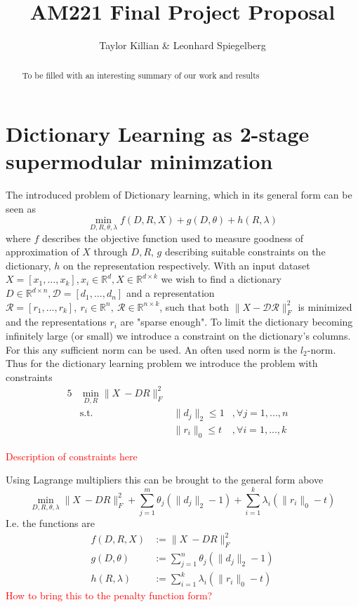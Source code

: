 \documentclass{article}
\newcommand{\R}{\mathbb{R}}
\begin{document}
\title{AM221 Final Project Proposal}
\author{Taylor Killian \& Leonhard Spiegelberg}
\maketitle

\begin{abstract}
To be filled with an interesting summary of our work and results

\end{abstract}


\section{Dictionary Learning as 2-stage supermodular minimzation}
The introduced problem of Dictionary learning, which in its general form can be seen as
\[
\min_{D, R, \theta, \lambda} f(D, R, X) + g(D, \theta) + h(R, \lambda)
\]
where $f$ describes the objective function used to measure goodness of approximation of $X$ through $D, R$, $g$ describing suitable constraints on the dictionary, $h$ on the representation respectively.
With an input dataset $X=[x_1, \dots, x_k],  x_i \in \R^d,  X \in \R^{d\times k}$ we wish to find a dictionary $D \in \R^{d\times n},  \mathcal{D} = [d_1, \dots, d_n]$ and a representation $\mathcal{R}=[r_1,\dots,r_k], \ r_i\in\R^n, \ \mathcal{R}\in\R^{n\times k}$, such that both $\|X-\mathcal{D}\mathcal{R}\|_F^2$ is minimized and the representations $r_i$ are "sparse enough". To limit the dictionary becoming infinitely large (or small) we introduce a constraint on the dictionary's columns. For this any sufficient norm can be used. An often used norm is the $l_2$-norm. 
Thus for the dictionary learning problem we introduce the problem with constraints
\begin{alignat}{5}
         &\min_{D, R} \|X \ -D R\|_F^2  & \quad   \\
         &\text{s.t.}  \quad  &\|d_j\|_2 \leq 1&, \forall j=1, ...,n  \quad \\
         &  \quad  &\|r_i\|_0 \leq t&, \forall i=1, ...,k  \quad 
\end{alignat}

\textcolor{red}{Description of constraints here}


Using Lagrange multipliers this can be brought to the general form above
\[
\min_{D, R, \theta, \lambda} \|X \ -D R\|_F^2 + \sum_{j=1}^m \theta_j (\| d_j\|_2 - 1)+ \sum_{i=1}^k \lambda_i (\| r_i \|_0 - t)
\]
I.e. the functions are
\[
\begin{split}
f(D, R, X) &:= \|X \ -D R\|_F^2 \\
g(D, \theta) &:= \sum_{j=1}^n \theta_j (\| d_j\|_2 - 1) \\
h(R, \lambda) &:= \sum_{i=1}^k \lambda_i (\| r_i \|_0 - t)
\end{split}
\]
\textcolor{red}{How to bring this to the penalty function form?}
\end{document}
